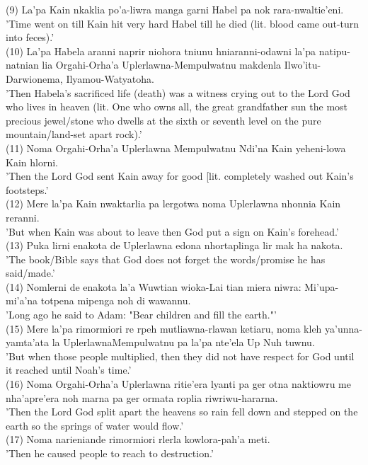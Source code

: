 \documentclass[10pt]{article}
\begin{document}
(9) La'pa Kain nkaklia po'a-liwra manga garni Habel pa nok rara-nwaltie'eni. 'Time went on till Kain hit very hard Habel till he died (lit. blood came out-turn into feces).'\\
(10) La'pa Habela aranni naprir niohora tniunu hniaranni-odawni la'pa natipu-natnian lia Orgahi-Orha'a Uplerlawna-Mempulwatnu makdenla Ilwo'itu-Darwionema, Ilyamou-Watyatoha.\\
'Then Habela's sacrificed life (death) was a witness crying out to the Lord God who lives in heaven (lit. One who owns all, the great grandfather sun the most precious jewel/stone who dwells at the sixth or seventh level on the pure mountain/land-set apart rock).'\\
(11) Noma Orgahi-Orha'a Uplerlawna Mempulwatnu Ndi'na Kain yeheni-lowa Kain hlorni.\\
'Then the Lord God sent Kain away for good [lit. completely washed out Kain's footsteps.'\\
(12) Mere la'pa Kain nwaktarlia pa lergotwa noma Uplerlawna nhonnia Kain reranni.\\
'But when Kain was about to leave then God put a sign on Kain's forehead.'\\
(13) Puka lirni enakota de Uplerlawna edona nhortaplinga lir mak ha nakota.\\
'The book/Bible says that God does not forget the words/promise he has said/made.'\\
(14) Nomlerni de enakota la'a Wuwtian wioka-Lai tian miera niwra: Mi'upa-mi'a'na totpena mipenga noh di wawannu.\\
'Long ago he said to Adam: "Bear children and fill the earth."'\\
(15) Mere la'pa rimormiori re rpeh mutliawna-rlawan ketiaru, noma kleh ya'unna-yamta'ata la UplerlawnaMempulwatnu pa la'pa nte'ela Up Nuh tuwnu.\\
'But when those people multiplied, then they did not have respect for God until it reached until Noah's time.'\\
(16) Noma Orgahi-Orha'a Uplerlawna ritie'era lyanti pa ger otna naktiowru me nha'apre'era noh marna pa ger ormata roplia riwriwu-hararna.\\
'Then the Lord God split apart the heavens so rain fell down and stepped on the earth so the springs of water would flow.'\\
(17) Noma narieniande rimormiori rlerla kowlora-pah'a meti.\\
'Then he caused people to reach to destruction.'\\
\end{document}

